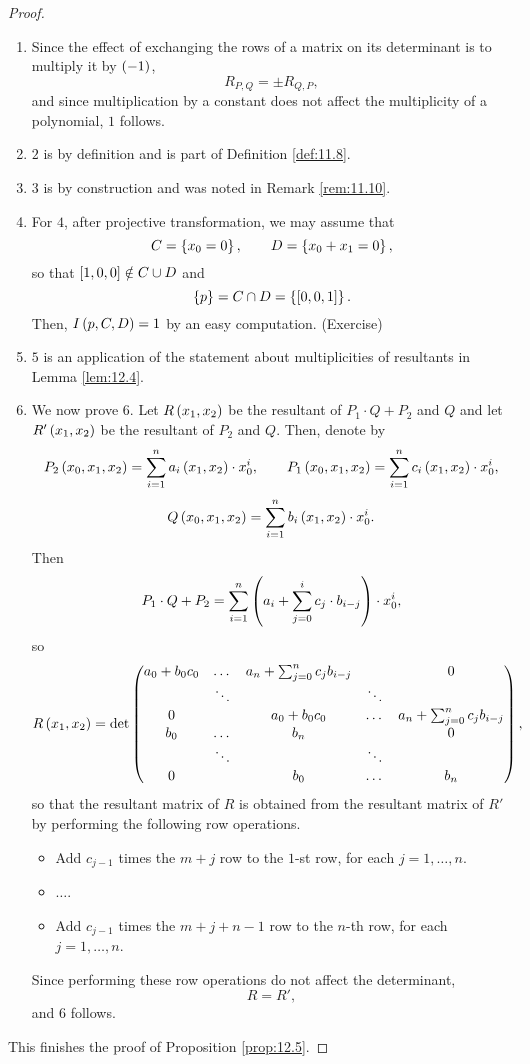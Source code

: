 \begin{proof}
\hfill
\begin{enumerate}
\item Since the effect of exchanging the rows of a matrix on its determinant is to multiply it by $ \rb{-1} $,
$$ R_{P, Q} = \pm R_{Q, P}, $$
and since multiplication by a constant does not affect the multiplicity of a polynomial, $ 1 $ follows.
\item $ 2 $ is by definition and is part of Definition \ref{def:11.8}.
\item $ 3 $ is by construction and was noted in Remark \ref{rem:11.10}.
\item For $ 4 $, after projective transformation, we may assume that
$$ C = \cb{x_0 = 0}, \qquad D = \cb{x_0 + x_1 = 0}, $$
so that $ \sb{1, 0, 0} \notin C \cup D $ and
$$ \cb{p} = C \cap D = \cb{\sb{0, 0, 1}}. $$
Then, $ I\rb{p, C, D} = 1 $ by an easy computation. (Exercise)
\item $ 5 $ is an application of the statement about multiplicities of resultants in Lemma \ref{lem:12.4}.
\item We now prove $ 6 $. Let $ R\rb{x_1, x_2} $ be the resultant of $ P_1 \cdot Q + P_2 $ and $ Q $ and let $ R'\rb{x_1, x_2} $ be the resultant of $ P_2 $ and $ Q $. Then, denote by
$$ P_2\rb{x_0, x_1, x_2} = \sum_{i = 1}^n a_i\rb{x_1, x_2} \cdot x_0^i, \qquad P_1\rb{x_0, x_1, x_2} = \sum_{i = 1}^n c_i\rb{x_1, x_2} \cdot x_0^i, $$
$$ Q\rb{x_0, x_1, x_2} = \sum_{i = 1}^n b_i\rb{x_1, x_2} \cdot x_0^i. $$
Then
$$ P_1 \cdot Q + P_2 = \sum_{i = 1}^n \rb{a_i + \sum_{j = 0}^i c_j \cdot b_{i - j}} \cdot x_0^i, $$
so
$$ R\rb{x_1, x_2} = \det
\begin{pmatrix}
a_0 + b_0c_0 & \dots & a_n + \sum_{j = 0}^n c_jb_{i - j} & & 0 \\
& \ddots & & \ddots & \\
0 & & a_0 + b_0c_0 & \dots & a_n + \sum_{j = 0}^n c_jb_{i - j} \\
b_0 & \dots & b_n & & 0 \\
& \ddots & & \ddots & \\
0 & & b_0 & \dots & b_n
\end{pmatrix},
$$
so that the resultant matrix of $ R $ is obtained from the resultant matrix of $ R' $ by performing the following row operations.
\begin{itemize}
\item Add $ c_{j - 1} $ times the $ m + j $ row to the $ 1 $-st row, for each $ j = 1, \dots, n $.
\item $ \dots $.
\item Add $ c_{j - 1} $ times the $ m + j + n - 1 $ row to the $ n $-th row, for each $ j = 1, \dots, n $.
\end{itemize}
Since performing these row operations do not affect the determinant,
$$ R = R', $$
and $ 6 $ follows.
\end{enumerate}
This finishes the proof of Proposition \ref{prop:12.5}.
\end{proof}


